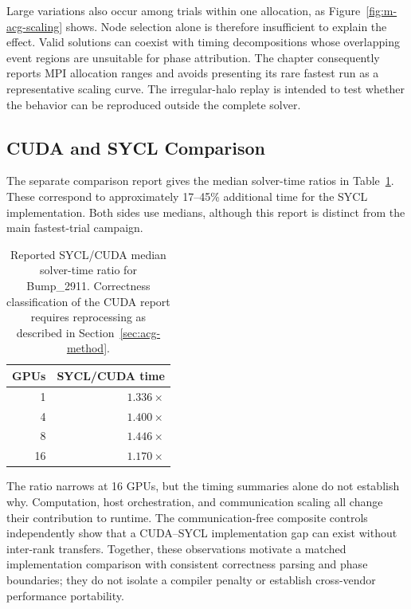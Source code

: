 Large variations also occur among trials within one allocation, as Figure~\ref{fig:m-acg-scaling} shows. Node selection alone is therefore insufficient to explain the effect. Valid solutions can coexist with timing decompositions whose overlapping event regions are unsuitable for phase attribution. The chapter consequently reports MPI allocation ranges and avoids presenting its rare fastest run as a representative scaling curve. The irregular-halo replay is intended to test whether the behavior can be reproduced outside the complete solver.

\subsection{CUDA and SYCL Comparison}

The separate comparison report gives the median solver-time ratios in Table~\ref{tab:m-sycl-control}. These correspond to approximately 17--45\% additional time for the SYCL implementation. Both sides use medians, although this report is distinct from the main fastest-trial campaign.

\begin{table}[htbp]
\centering
\caption{Reported SYCL/CUDA median solver-time ratio for Bump\_2911. Correctness classification of the CUDA report requires reprocessing as described in Section~\ref{sec:acg-method}.}
\label{tab:m-sycl-control}
\begin{tabular}{rr}
\toprule
GPUs & SYCL/CUDA time\\
\midrule
1 & $1.336\times$\\
4 & $1.400\times$\\
8 & $1.446\times$\\
16 & $1.170\times$\\
\bottomrule
\end{tabular}
\end{table}

The ratio narrows at 16 GPUs, but the timing summaries alone do not establish why. Computation, host orchestration, and communication scaling all change their contribution to runtime. The communication-free composite controls independently show that a CUDA--SYCL implementation gap can exist without inter-rank transfers. Together, these observations motivate a matched implementation comparison with consistent correctness parsing and phase boundaries; they do not isolate a compiler penalty or establish cross-vendor performance portability.
